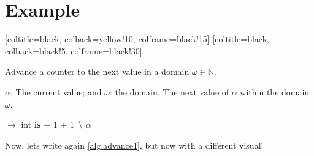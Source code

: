 \documentclass{article}
\begin{document}
\section{Example}
\label{sec:examples}

\emph{\kant[1]}

[coltitle=black, colback=yellow!10, colframe=black!15]
[coltitle=black, colback=black!5, colframe=black!30]

\newcommand{\bracesemptyset}{\ensuremath{\lbrace\,\rbrace}}

\begin{tcbalgorithm}{Advance a counter to the next value in a domain $\omega \in \mathbb{N}$.}
  \label{alg:advance1}
\begin{algorithmic}[1]
  \Statex \Input $\alpha$: The current value; and $\omega$: the domain.
  \Statex \Output The next value of $\alpha$ within the domain $\omega$.

  \Vspace

   $\rightarrow$ int \textbf{is}
    \Let {\alpha} {\alpha + 1}
    \While{$\alpha \not\in \omega \And \omega \neq \bracesemptyset$}
      \Let {\alpha} {\alpha + 1}
    \EndWhile
    \If{$\omega \neq \bracesemptyset$}
      \Let {\omega} {\omega \,\backslash \lbrace \alpha \rbrace}
    \EndIf
    \State \Return $\alpha$
  \EndFunction
\end{algorithmic}
\end{tcbalgorithm}

Now, lets write again \autoref{alg:advance1}, but now with a different visual!
\end{document}
